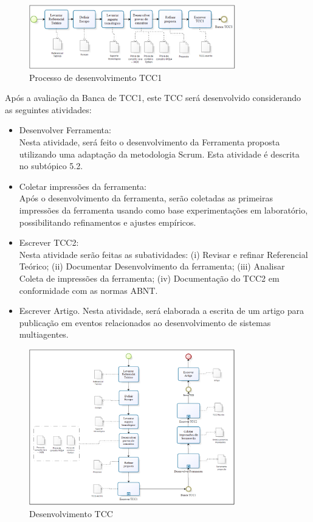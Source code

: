 \begin{figure}[h]
\centering
\label{f26}
\includegraphics[width=0.8\textwidth]{figuras/f26}
\caption{Processo de desenvolvimento TCC1}
\end{figure}

Após a avaliação da Banca de TCC1, este TCC será desenvolvido considerando as seguintes atividades:

\begin{itemize}
\item Desenvolver Ferramenta:\\
Nesta atividade, será feito o desenvolvimento da Ferramenta proposta utilizando uma adaptação da metodologia Scrum. Esta atividade é descrita no subtópico 5.2.

\item Coletar impressões da ferramenta:\\
Após o desenvolvimento da ferramenta, serão coletadas as primeiras impressões da ferramenta usando como base experimentações em laboratório, possibilitando refinamentos e ajustes empíricos.

\item Escrever TCC2:\\
Nesta atividade serão feitas as subatividades: (i) Revisar e  refinar Referencial Teórico; (ii) Documentar Desenvolvimento da ferramenta; (iii) Analisar Coleta de impressões da ferramenta; (iv) Documentação do TCC2 em conformidade com as normas ABNT.

\item Escrever Artigo.
Nesta atividade, será elaborada a escrita de um artigo para publicação em eventos relacionados ao desenvolvimento de sistemas multiagentes.

\end{itemize}


\begin{figure}[h]
\centering
\label{f27}
\includegraphics[width=0.8\textwidth]{figuras/f27}
\caption{Desenvolvimento TCC}
\end{figure}

